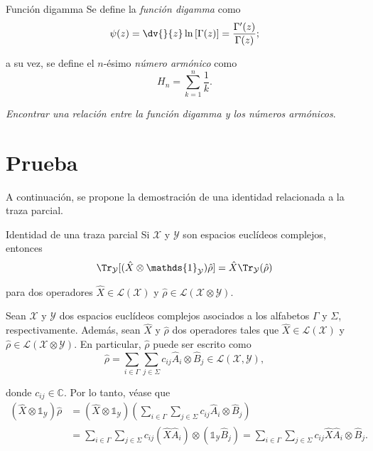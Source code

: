 \begin{problema}{Función digamma}{}{}
Se define la \textit{función digamma} como
\begin{equation}
    \psi(z) = \dv{}{z}\ln\left[\Gamma(z)\right] =\dfrac{\Gamma'(z)}{\Gamma(z)};
\end{equation}

a su vez, se define el $n$-ésimo \textit{número armónico} como
 \begin{equation}
    H_{n} = \sum_{k = 1}^{n}\dfrac{1}{k}.
\end{equation}

\textit{Encontrar una relación entre la función digamma y los números armónicos}.
\end{problema}

\section{Prueba}
A continuación, se propone la demostración de una identidad relacionada a la traza parcial.

\begin{proposicion}{Identidad de una traza parcial}{}{}
Si $\mathcal{X}$ y $\mathcal{Y}$ son espacios euclídeos complejos, entonces 
\[
\Tr_{\mathcal{Y}} [(\hat{X} \otimes \mathds{1}_{\mathcal{Y}})\hat{\rho}] = \hat{X} \Tr_{\mathcal{Y}} (\hat{\rho})
\]

para dos operadores $\hat{X} \in \mathcal{L}(\mathcal{X})$ y $\hat{\rho} \in \mathcal{L}(\mathcal{X} \otimes \mathcal{Y})$.
\end{proposicion}

Sean $\mathcal{X}$ y $\mathcal{Y}$ dos espacios euclídeos complejos asociados a los alfabetos $\Gamma$ y $\Sigma$, respectivamente. Además, sean $\hat{X}$ y $\hat{\rho}$ dos operadores tales que $\hat{X} \in \mathcal{L}(\mathcal{X})$ y $\hat{\rho} \in \mathcal{L}(\mathcal{X} \otimes \mathcal{Y})$. En particular, $\hat{\rho}$ puede ser escrito como
\[
\hat{\rho} = \sum_{i \in \Gamma} \sum_{j \in \Sigma} c_{ij} \hat{A}_{i} \otimes \hat{B}_{j} \in \mathcal{L}(\mathcal{X}, \mathcal{Y}),
\]

donde $c_{ij} \in \mathbb{C}$. Por lo tanto, véase que
\begin{align*}
    (\hat{X} \otimes \mathds{1}_{\mathcal{Y}}) \hat{\rho}
    &= (\hat{X} \otimes \mathds{1}_{\mathcal{Y}})\left(\sum_{i \in \Gamma} \sum_{j \in \Sigma} c_{ij} \hat{A}_{i} \otimes \hat{B}_{j}\right)\\
    &= \sum_{i \in \Gamma} \sum_{j \in \Sigma} c_{ij}(\hat{X} \hat{A}_{i}) \otimes (\mathds{1}_{\mathcal{Y}} \hat{B}_{j}) = \sum_{i \in \Gamma} \sum_{j \in \Sigma} c_{ij} \hat{X} \hat{A}_{i} \otimes \hat{B}_{j}.
\end{align*}

